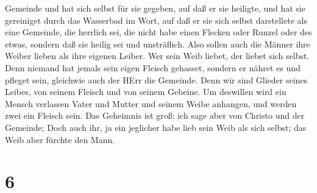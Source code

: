 Gemeinde und hat sich selbst für sie gegeben,  auf daß er
sie heiligte, und hat sie gereiniget durch das Wasserbad im Wort,
 auf daß er sie sich selbst darstellete als eine Gemeinde,
die herrlich sei, die nicht habe einen Flecken oder Runzel oder des
etwas, sondern daß sie heilig sei und unsträflich.  Also
sollen auch die Männer ihre Weiber lieben als ihre eigenen Leiber. Wer
sein Weib liebet, der liebet sich selbst.  Denn niemand hat
jemals sein eigen Fleisch gehasset, sondern er nähret es und pfleget
sein, gleichwie auch der HErr die Gemeinde.  Denn wir sind
Glieder seines Leibes, von seinem Fleisch und von seinem Gebeine.
 Um deswillen wird ein Mensch verlassen Vater und Mutter
und seinem Weibe anhangen, und werden zwei ein Fleisch sein.
 Das Geheimnis ist groß; ich sage aber von Christo und der
Gemeinde;  Doch auch ihr, ja ein jeglicher habe lieb sein
Weib als sich selbst; das Weib aber fürchte den Mann.

\hypertarget{section-5}{%
\section{6}\label{section-5}}


